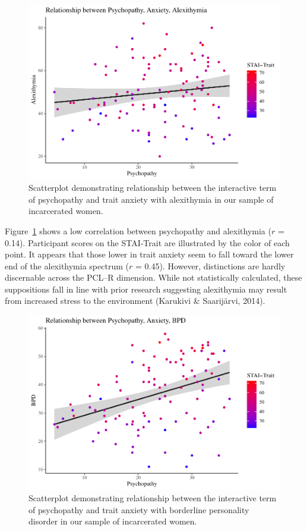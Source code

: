 \documentclass[
  man,floatsintext]{apa7}
\begin{document}
\begin{figure}
\includegraphics[width=1\linewidth]{HalversonAnnaliseMAPSSThesis2024_files/figure-latex/c-path-scatterplot-1} \caption{Scatterplot demonstrating relationship between the interactive term of psychopathy and trait anxiety with alexithymia in our sample of incarcerated women.}\label{fig:c-path-scatterplot}
\end{figure}

Figure~\ref{fig:c-path-scatterplot} shows a low correlation between psychopathy and alexithymia (\(r\) = 0.14). Participant scores on the STAI-Trait are illustrated by the color of each point. It appears that those lower in trait anxiety seem to fall toward the lower end of the alexithymia spectrum (\(r\) = 0.45). However, distinctions are hardly discernable across the PCL--R dimension. While not statistically calculated, these suppositions fall in line with prior research suggesting alexithymia may result from increased stress to the environment (Karukivi \& Saarijärvi, 2014).



\begin{figure}
\includegraphics[width=1\linewidth]{HalversonAnnaliseMAPSSThesis2024_files/figure-latex/a-path-scatterplot-1} \caption{Scatterplot demonstrating relationship between the interactive term of psychopathy and trait anxiety with borderline personality disorder in our sample of incarcerated women.}\label{fig:a-path-scatterplot}
\end{figure}
\end{document}
